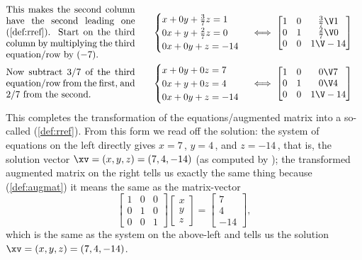 \begin{example}
\begin{solution}
\begin{align*}
\\[0ex plus 1ex]&
\parbox{0.4\linewidth}{This makes the second column have the second leading one (\cref{def:rref}).  
Start on the third column by multiplying the third equation\slash row by~\((-7)\).}
\quad&
\begin{cases}
x+0y+\frac37z=1\\ 0x+y+\frac27z=0\\ 0x+0y+z=-14
\end{cases}
&\iff %
\begin{bmatrix} 1&0&\frac37\V1\\0&1&\frac27\V0\\0&0&1\V-14 \end{bmatrix}
\\[0ex plus 1ex]&
\parbox{0.4\linewidth}{Now subtract \(3/7\)~of the third equation\slash row from the first, and \(2/7\) from the second.}
\quad&
\begin{cases}
x+0y+0z=7\\ 0x+y+0z=4\\ 0x+0y+z=-14
\end{cases}
&\iff %
\begin{bmatrix} 1&0&0\V7\\0&1&0\V4\\0&0&1\V-14 \end{bmatrix}
\end{align*}
This completes the transformation of the equations\slash augmented matrix into a so-called  (\cref{def:rref}).
From this form we read off the solution:  the system of equations on the left directly gives \(x=7\)\,, \(y=4\)\,, and \(z=-14\)\,, that is, the solution vector \(\xv=(x,y,z)=(7,4,-14)\) (as computed by \script);
the transformed augmented matrix on the right tells us exactly the same thing because (\cref{def:augmat}) it means the same as the matrix-vector 
\begin{equation*}
\begin{bmatrix} 1&0&0\\0&1&0\\0&0&1 \end{bmatrix}
\begin{bmatrix} x\\y\\z \end{bmatrix}
=\begin{bmatrix} 7\\4\\-14 \end{bmatrix},
\end{equation*}
which is the same as the system on the above-left and tells us the solution \(\xv=(x,y,z)=(7,4,-14)\).
\end{solution}
\end{example}





